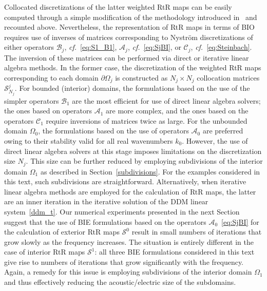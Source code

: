 \documentclass[11pt]{article}
\numberwithin{equation}{section}
\begin{document}
Collocated discretizations of the latter weighted RtR maps can be easily computed through a simple modification of the methodology introduced in~\cite{turc2016well} and recounted above. Nevertheless, the representation of RtR maps in terms of BIO requires use of inverses of matrices corresponding to Nystr\"om discretizations of either operators $\mathcal{B}_j$, \emph{cf.}~\eqref{eq:S1_B1}, $\mathcal{A}_j$, \emph{cf.}~\eqref{eq:SjBI}, or $\mathcal{C}_j$, \emph{cf.}~\eqref{eq:Steinbach}. The inversion of these matrices can be performed via direct or iterative linear algebra methods. In the former case, the discretization of the weighted RtR maps corresponding to each domain $\partial \Omega_j$ is constructed as $N_j\times N_j$ collocation matrices  $\mathcal{S}^j_{N_j}$. For bounded (interior) domains, the formulations based on the use of the simpler operators $\mathcal{B}_1$ are the most efficient for use of direct linear algebra solvers; the ones based on operators $\mathcal{A}_1$ are more complex, and the ones based on the operators $\mathcal{C}_1$ require inversions of matrices twice as large. For the unbounded domain $\Omega_0$, the formulations based on the use of operators $\mathcal{A}_0$ are preferred owing to their stability valid for all real wavenumbers $k_0$. However, the use of direct linear algebra solvers at this stage imposes limitations on the discretization size $N_j$. This size can be further reduced by employing subdivisions of the interior domain $\Omega_1$ as described in Section~\ref{subdivisions}. For the examples considered in this text, such subdivisions are straightforward. Alternatively, when iterative linear algebra methods are employed for the calculation of RtR maps, the latter are an inner iteration in the iterative solution of the DDM linear system~\eqref{ddm_t}. Our numerical experiments presented in the next Section suggest that the use of BIE formulations based on the operators $\mathcal{A}_0$~\eqref{eq:SjBI} for the calculation of exterior RtR maps $\mathcal{S}^0$ result in small numbers of iterations that grow slowly as the frequency increases. The situation is entirely different in the case of interior RtR maps $\mathcal{S}^1$: all three BIE formulations considered in this text give rise to numbers of iterations that grow significantly with the frequency. Again, a remedy for this issue is employing subdivisions of the interior domain $\Omega_1$ and thus effectively reducing the acoustic/electric size of the subdomains.
\end{document}

